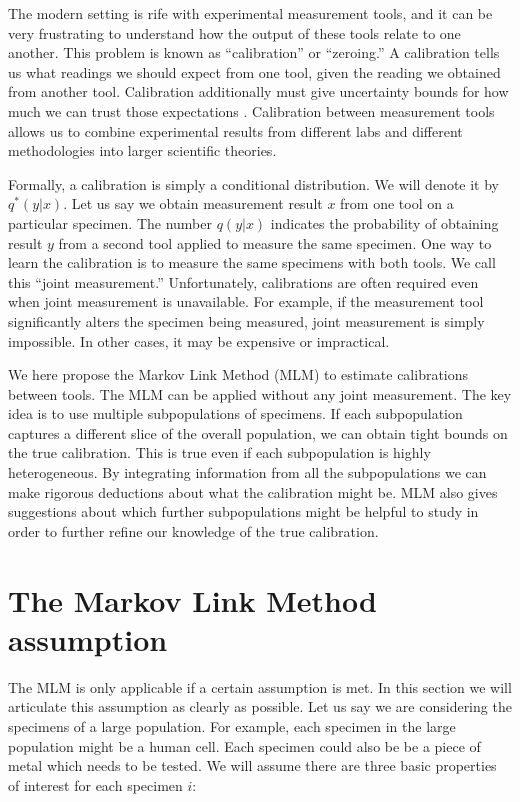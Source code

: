 The modern setting is rife with experimental measurement tools, and it can be very frustrating to understand how the output of these tools relate to one another.  This problem is known as ``calibration'' or ``zeroing.''  A calibration tells us what readings we should expect from one tool, given the reading we obtained from another tool.   Calibration additionally must give uncertainty bounds for how much we can trust those expectations  \cite{bipm2008international}.  Calibration between measurement tools allows us to combine experimental results from different labs and different methodologies into larger scientific theories.  

Formally, a calibration is simply a conditional distribution.  We will denote it by $q^*(y|x)$.  Let us say we obtain measurement result $x$ from one tool on a particular specimen.  The number $q(y|x)$ indicates the probability of obtaining result $y$ from a second tool applied to measure the same specimen.  One way to learn the calibration is to measure the same specimens with both tools.  We call this ``joint measurement.''  Unfortunately, calibrations are often required even when joint measurement is unavailable.  For example, if the measurement tool significantly alters the specimen being measured, joint measurement is simply impossible.  In other cases, it may be expensive or impractical.

We here propose the Markov Link Method (MLM) to estimate calibrations between tools.  The MLM can be applied without any joint measurement.  The key idea is to use multiple subpopulations of specimens.  If each subpopulation captures a different slice of the overall population, we can obtain tight bounds on the true calibration.  This is true even if each subpopulation is highly heterogeneous.  By integrating information from all the subpopulations we can make rigorous deductions about what the calibration might be.  MLM also gives suggestions about which further subpopulations might be helpful to study in order to further refine our knowledge of the true calibration.  

\section{The Markov Link Method assumption}

The MLM is only applicable if a certain assumption is met.  In this section we will articulate this assumption as clearly as possible.  Let us say we are considering the specimens of a large population.  For example, each specimen in the large population might be a human cell.  Each specimen could also be be a piece of metal which needs to be tested.  We will assume there are three basic properties of interest for each specimen $i$:

